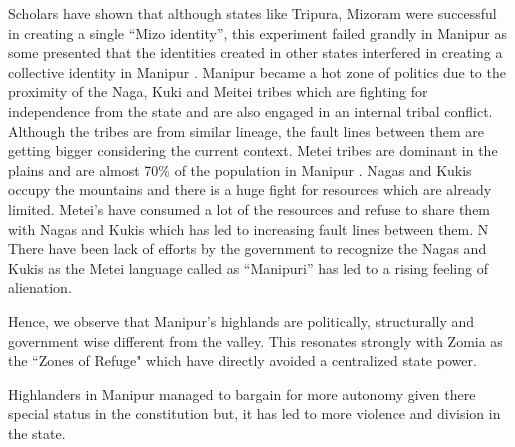 Scholars have shown that although states like Tripura, Mizoram were successful in creating a single \enquote{Mizo identity}, this experiment failed grandly in Manipur as some presented that the identities created in other states interfered in creating a collective identity in Manipur \citep{hassan2007state}. Manipur became a hot zone of politics due to the proximity of the Naga, Kuki and Meitei tribes which are fighting for independence from the state and are also engaged in an internal tribal conflict. Although the tribes are from similar lineage, the fault lines between them are getting bigger considering the current context. Metei tribes are dominant in the plains and are almost 70\% of the population in Manipur \citep{arora2012politics}. Nagas and Kukis occupy the mountains and there is a huge fight for resources which are already limited. Metei's have consumed a lot of the resources and refuse to share them with Nagas and Kukis which has led to increasing fault lines between them. N There have been lack of efforts by the government to recognize the Nagas and Kukis as the Metei language called as \enquote{Manipuri} has led to a rising feeling of alienation.
\begin{sloppypar}

    Hence, we observe that Manipur's highlands are politically, structurally and government wise different from the valley. This resonates strongly with Zomia as the ``Zones of Refuge" which have directly avoided a centralized state power.
    
     Highlanders in Manipur managed to bargain for more autonomy given there special status in the constitution but, it has led to more violence and division in the state.
    \end{sloppypar}
